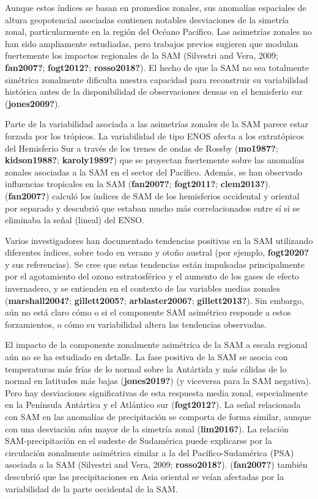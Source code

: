\documentclass[12pt,oneside]{reedthesis}
\begin{document}
Aunque estos índices se basan en promedios zonales, sus anomalías espaciales de altura geopotencial asociadas contienen notables desviaciones de la simetría zonal, particularmente en la región del Océano Pacífico.
Las asimetrías zonales no han sido ampliamente estudiadas, pero trabajos previos sugieren que modulan fuertemente los impactos regionales de la SAM (Silvestri and Vera, 2009; \textbf{fan2007?}; \textbf{fogt2012?}; \textbf{rosso2018?}).
El hecho de que la SAM no sea totalmente simétrica zonalmente dificulta nuestra capacidad para reconstruir su variabilidad histórica antes de la disponibilidad de observaciones densas en el hemisferio sur (\textbf{jones2009?}).

Parte de la variabilidad asociada a las asimetrías zonales de la SAM parece estar forzada por los trópicos.
La variabilidad de tipo ENOS afecta a los extratópicos del Hemisferio Sur a través de los trenes de ondas de Rossby (\textbf{mo1987?}; \textbf{kidson1988?}; \textbf{karoly1989?}) que se proyectan fuertemente sobre las anomalías zonales asociadas a la SAM en el sector del Pacífico.
Además, se han observado influencias tropicales en la SAM (\textbf{fan2007?}; \textbf{fogt2011?}; \textbf{clem2013?}).
(\textbf{fan2007?}) calculó los índices de SAM de los hemisferios occidental y oriental por separado y descubrió que estaban mucho más correlacionados entre sí si se eliminaba la señal (lineal) del ENSO.

Varios investigadores han documentado tendencias positivas en la SAM utilizando diferentes índices, sobre todo en verano y otoño austral (por ejemplo, \textbf{fogt2020?} y sus referencias).
Se cree que estas tendencias están impulsadas principalmente por el agotamiento del ozono estratosférico y el aumento de los gases de efecto invernadero, y se entienden en el contexto de las variables medias zonales (\textbf{marshall2004?}; \textbf{gillett2005?}; \textbf{arblaster2006?}; \textbf{gillett2013?}).
Sin embargo, aún no está claro cómo o si el componente SAM asimétrico responde a estos forzamientos, o cómo su variabilidad altera las tendencias observadas.

El impacto de la componente zonalmente asimétrica de la SAM a escala regional aún no se ha estudiado en detalle.
La fase positiva de la SAM se asocia con temperaturas más frías de lo normal sobre la Antártida y más cálidas de lo normal en latitudes más bajas (\textbf{jones2019?}) (y viceversa para la SAM negativa).
Pero hay desviaciones significativas de esta respuesta media zonal, especialmente en la Península Antártica y el Atlántico sur (\textbf{fogt2012?}).
La señal relacionada con SAM en las anomalías de precipitación se comporta de forma similar, aunque con una desviación aún mayor de la simetría zonal (\textbf{lim2016?}).
La relación SAM-precipitación en el sudeste de Sudamérica puede explicarse por la circulación zonalmente asimétrica similar a la del Pacífico-Sudamérica (PSA) asociada a la SAM (Silvestri and Vera, 2009; \textbf{rosso2018?}).
(\textbf{fan2007?}) también descubrió que las precipitaciones en Asia oriental se veían afectadas por la variabilidad de la parte occidental de la SAM.
\end{document}
